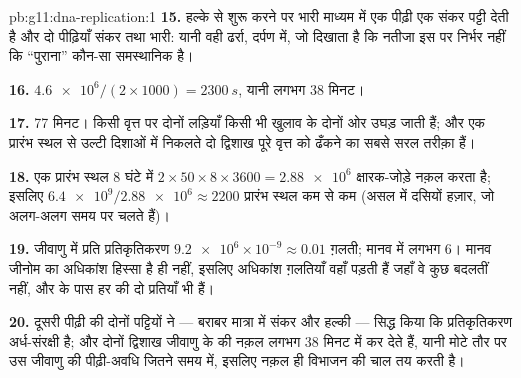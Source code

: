 \begin{solution}{pb:g11:dna-replication:1}
\textbf{15.} हल्के से शुरू करने पर भारी माध्यम में एक पीढ़ी एक संकर पट्टी
देती है और दो पीढ़ियाँ संकर तथा भारी: यानी वही ढर्रा, दर्पण में, जो
दिखाता है कि नतीजा इस पर निर्भर नहीं कि ``पुराना'' कौन-सा समस्थानिक है।

\textbf{16.} $\num{4.6e6}/(2 \times 1000) = \qty{2300}{s}$, यानी लगभग
38 मिनट।

\textbf{17.} 77 मिनट। किसी वृत्त पर दोनों लड़ियाँ किसी भी खुलाव के दोनों
ओर उघड़ जाती हैं; और एक प्रारंभ स्थल से उल्टी दिशाओं में निकलते दो
द्विशाख पूरे वृत्त को ढँकने का सबसे सरल तरीक़ा हैं।

\textbf{18.} एक प्रारंभ स्थल 8 घंटे में $2 \times 50 \times 8 \times 3600 =
\num{2.88e6}$ क्षारक-जोड़े नक़ल करता है; इसलिए
$\num{6.4e9}/\num{2.88e6}
\approx 2200$ प्रारंभ स्थल कम से कम (असल में दसियों हज़ार, जो अलग-अलग
समय पर चलते हैं)।

\textbf{19.} जीवाणु में प्रति प्रतिकृतिकरण
$\num{9.2e6} \times 10^{-9} \approx 0.01$ ग़लती; मानव  में लगभग 6। मानव जीनोम का अधिकांश हिस्सा
 है ही नहीं, इसलिए अधिकांश ग़लतियाँ वहाँ पड़ती हैं जहाँ वे कुछ बदलतीं
नहीं, और  के पास हर  की दो प्रतियाँ भी हैं।

\textbf{20.} दूसरी पीढ़ी की दोनों पट्टियों ने --- बराबर मात्रा में संकर
और हल्की --- सिद्ध किया कि प्रतिकृतिकरण अर्ध-संरक्षी है; और दोनों
द्विशाख जीवाणु के  की नक़ल लगभग 38 मिनट में कर देते हैं, यानी
मोटे तौर पर उस जीवाणु की पीढ़ी-अवधि जितने समय में, इसलिए नक़ल ही विभाजन
की चाल तय करती है।
\end{solution}
